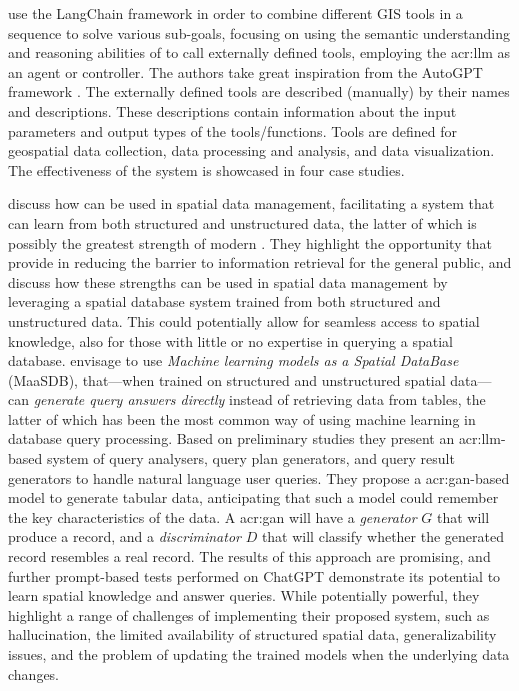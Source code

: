 \cite{zhangGeoGPTUnderstandingProcessing2023} use the LangChain framework in order to combine different GIS tools in a sequence to solve various sub-goals, focusing on using the semantic understanding and reasoning abilities of  to call externally defined tools, employing the \acrshort{acr:llm} as an agent or controller. The authors take great inspiration from the AutoGPT framework \citep{richardAutoGPTHeartOpensource2023}. The externally defined tools are described (manually) by their names and descriptions. These descriptions contain information about the input parameters and output types of the tools/functions. Tools are defined for geospatial data collection, data processing and analysis, and data visualization. The effectiveness of the system is showcased in four case studies.

\cite{qiMaaSDBSpatialDatabases2023} discuss how  can be used in spatial data management, facilitating a system that can learn from both structured and unstructured data, the latter of which is possibly the greatest strength of modern . They highlight the opportunity that  provide in reducing the barrier to information retrieval for the general public, and discuss how these strengths can be used in spatial data management by leveraging a spatial database system trained from both structured and unstructured data. This could potentially allow for seamless access to spatial knowledge, also for those with little or no expertise in querying a spatial database. \citeauthor{qiMaaSDBSpatialDatabases2023} envisage to use \textit{Machine learning models as a Spatial DataBase} (MaaSDB), that---when trained on structured and unstructured spatial data---can \textit{generate query answers directly} instead of retrieving data from tables, the latter of which has been the most common way of using machine learning in database query processing. Based on preliminary studies they present an \acrshort{acr:llm}-based system of query analysers, query plan generators, and query result generators to handle natural language user queries. They propose a \gls{acr:gan}-based model to generate tabular data, anticipating that such a model could remember the key characteristics of the data. A \gls{acr:gan} will have a \textit{generator} $G$ that will produce a record, and a \textit{discriminator} $D$ that will classify whether the generated record resembles a real record. The results of this approach are promising, and further prompt-based tests performed on ChatGPT demonstrate its potential to learn spatial knowledge and answer queries. While potentially powerful, they highlight a range of challenges of implementing their proposed system, such as hallucination, the limited availability of structured spatial data, generalizability issues, and the problem of updating the trained models when the underlying data changes.



